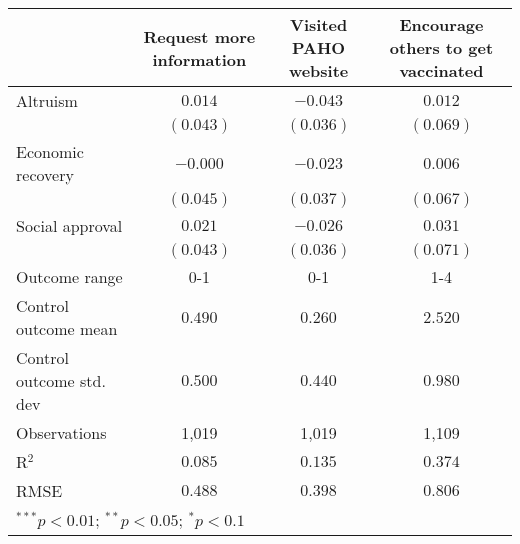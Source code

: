 \begin{table}
\begin{center}
\begin{tabular}{l c c c}
\hline
 & Request more information & Visited PAHO website & Encourage others to get vaccinated \\
\hline
Altruism                 & $0.014$   & $-0.043$  & $0.012$   \\
                         & $(0.043)$ & $(0.036)$ & $(0.069)$ \\
Economic recovery        & $-0.000$  & $-0.023$  & $0.006$   \\
                         & $(0.045)$ & $(0.037)$ & $(0.067)$ \\
Social approval          & $0.021$   & $-0.026$  & $0.031$   \\
                         & $(0.043)$ & $(0.036)$ & $(0.071)$ \\
\hline
Outcome range            & 0-1       & 0-1       & 1-4       \\
Control outcome mean     & $0.490$   & $0.260$   & $2.520$   \\
Control outcome std. dev & $0.500$   & $0.440$   & $0.980$   \\
Observations             & 1,019     & 1,019     & 1,109     \\
R$^{2}$                  & $0.085$   & $0.135$   & $0.374$   \\
RMSE                     & $0.488$   & $0.398$   & $0.806$   \\
\hline
\multicolumn{4}{l}{\scriptsize{$^{***}p<0.01$; $^{**}p<0.05$; $^{*}p<0.1$}}
\end{tabular}
\caption{}
\label{table:Tables and Figures/SI_table23_motiv_Argentina_behav}
\end{center}
\end{table}
